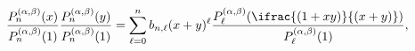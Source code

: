 \[\frac{\mathop{P^{(\alpha,\beta)}_{n}\/}\nolimits\!\left(x\right)}{\mathop{P^{(%
\alpha,\beta)}_{n}\/}\nolimits\!\left(1\right)}\frac{\mathop{P^{(\alpha,\beta)%
}_{n}\/}\nolimits\!\left(y\right)}{\mathop{P^{(\alpha,\beta)}_{n}\/}\nolimits%
\!\left(1\right)}=\sum_{\ell=0}^{n}b_{n,\ell}(x+y)^{\ell}\*\frac{\mathop{P^{(%
\alpha,\beta)}_{\ell}\/}\nolimits\!\left(\ifrac{(1+xy)}{(x+y)}\right)}{\mathop%
{P^{(\alpha,\beta)}_{\ell}\/}\nolimits\!\left(1\right)},\]